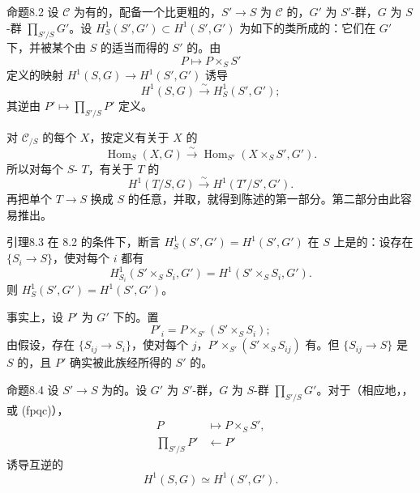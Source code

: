 \begin{SGAresult}{命题}{8.2}
设 $\mathscr C$ 为有的，配备一个比更粗的，$S'\to S$ 为 $\mathscr C$ 的，$G'$ 为 $S'$-群，$G$ 为 $S$-群 $\prod_{S'/S}G'$。设 $H^1_S(S',G')\subset H^1(S',G')$ 为如下的类所成的：它们在 $G'$ 下，并被某个由 $S$ 的适当而得的 $S'$ 的。由
\[P\longmapsto P\times_SS'\]
定义的映射 $H^1(S,G)\to H^1(S',G')$ 诱导
\[H^1(S,G)\xrightarrow{\sim}H^1_S(S',G');\]
其逆由 $P'\mapsto\prod_{S'/S}P'$ 定义。
\end{SGAresult}
对 $\mathscr C_{/S}$ 的每个 $X$，按定义有关于 $X$ 的
\[\operatorname{Hom}_S(X,G)\xrightarrow{\sim}\operatorname{Hom}_{S'}(X\times_SS',G').\]
所以对每个 $S$- $T$，有关于 $T$ 的
\[H^1(T/S,G)\xrightarrow{\sim}H^1(T'/S',G').\]
再把单个 $T\to S$ 换成 $S$ 的任意，并取，就得到陈述的第一部分。第二部分由此容易推出。
\begin{SGAresult}{引理}{8.3}
在 8.2 的条件下，断言 $H^1_S(S',G')=H^1(S',G')$ 在 $S$ 上是的：设存在 $\{S_i\to S\}$，使对每个 $i$ 都有
\[H^1_{S_i}(S'\times_SS_i,G')=H^1(S'\times_SS_i,G').\]
则 $H^1_S(S',G')=H^1(S',G')$。
\end{SGAresult}
事实上，设 $P'$ 为 $G'$ 下的。置
\[P'_i=P\mathop{\times}_{S'}(S'\times_SS_i);\]
由假设，存在 $\{S_{ij}\to S_i\}$，使对每个 $j$，$P'\times_{S'}(S'\times_SS_{ij})$ 有。但 $\{S_{ij}\to S\}$ 是 $S$ 的，且 $P'$ 确实被此族经所得的 $S'$ 的。
\begin{SGAresult}{命题}{8.4}
设 $S'\to S$ 为的。设 $G'$ 为 $S'$-群，$G$ 为 $S$-群 $\prod_{S'/S}G'$。对于（相应地，，或 (fpqc)），
\[\begin{aligned}
P&\longmapsto P\times_SS',\\
\prod_{S'/S}P'&\longleftarrow P'
\end{aligned}\]
诱导互逆的
\[H^1(S,G)\simeq H^1(S',G').\]
\end{SGAresult}
